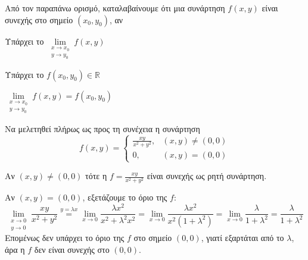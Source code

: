 

\begin{rem}
  Από τον παραπάνω ορισμό, καταλαβαίνουμε ότι μια συνάρτηση $ f(x,y) $ 
  είναι συνεχής στο σημείο $ (x_{0}, y_{0}) $, αν
  \begin{myitemize}
    \item Υπάρχει το $ \lim\limits_{\substack{x\to x_{0} \\y \to y_{0}}} f(x,y) $
    \item Υπάρχει το $ f(x_{0}, y_{0}) \in \mathbb{R} $
    \item $  \lim\limits_{\substack{x\to x_{0} \\ y \to y_{0}}} f(x,y) = 
      f(x_{0}, y_{0}) $
  \end{myitemize}
\end{rem}

\begin{example}
  Να μελετηθεί πλήρως ως προς τη συνέχεια η συνάρτηση 
  \[
    f(x,y) = 
    \begin{cases} 
      \frac{xy}{x^{2}+y^{2}}, & (x,y) \neq (0,0) \\ 
      0, & (x,y) = (0,0) 
    \end{cases}  
  \]
  \begin{solution}
  \item {}              
    Αν $ (x,y) \neq (0,0) $ τότε η $f= \frac{xy}{x^{2}+y^{2}} $ είναι συνεχής 
    ως ρητή συνάρτηση.

    Αν $ (x,y)=(0,0) $, εξετάζουμε το όριο της $f$: 
    \[
      \lim\limits_{\substack{x\to 0 \\y \to 0}} \frac{xy}{x^{2}+y^{2}}
      \overset{y= \lambda x}{=} 
      \lim_{x \to 0} \frac{\lambda x^{2}}{x^{2}+ \lambda ^{2} x^{2}} = 
      \lim_{x \to 0} \frac{\lambda x^{2}}{x^{2} (1+ \lambda ^{2})} = \lim_{x \to 0} 
      \frac{\lambda}{1 + \lambda ^{2}} = \frac{\lambda}{1 + \lambda ^{2}}
    \] 
    Επομένως δεν υπάρχει το όριο της $f$ στο σημείο $ (0,0) $, γιατί εξαρτάται από το 
    $\lambda$, άρα η $f$ δεν είναι συνεχής στο $ (0,0) $.
  \end{solution}
\end{example}

